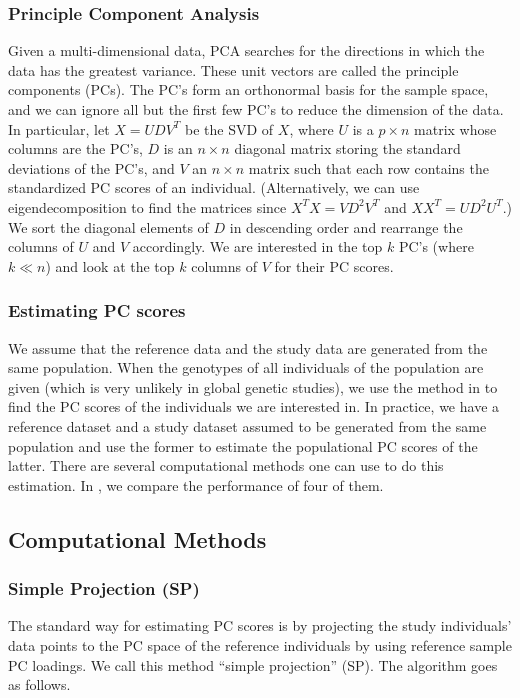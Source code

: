 \documentclass{article}
\begin{document}
\subsubsection{Principle Component Analysis}\label{pca-intro}
Given a multi-dimensional data, PCA searches for the directions in which the data has the greatest variance.
These unit vectors are called the principle components (PCs).
The PC's form an orthonormal basis for the sample space,
and we can ignore all but the first few PC's to reduce the dimension of the data.
In particular, let $X=UDV^T$ be the SVD of $X$,
where $U$ is a $p \times n$ matrix whose columns are the PC's,
$D$ is an $n \times n$ diagonal matrix storing the standard deviations of the PC's,
and $V$ an $n \times n$ matrix such that each row contains the standardized PC scores of an individual.
(Alternatively, we can use eigendecomposition to find the matrices since $X^T X = VD^2V^T$ and $X X^T = UD^2U^T$.)
We sort the diagonal elements of $D$ in descending order and rearrange the
columns of $U$ and $V$ accordingly.
We are interested in the top $k$ PC's (where $k \ll n$) and look at the top $k$
columns of $V$ for their PC scores.

\subsubsection{Estimating PC scores}

We assume that the reference data and the study data are generated from the same
population.
When the genotypes of all individuals of the population are given (which is very
unlikely in global genetic studies),
we use the method in  to find the PC scores of the individuals
we are interested in.
In practice, we have a reference dataset and a study dataset assumed to be generated from the
same population and use the former to estimate the populational PC scores of the latter.
There are several computational methods one can use to do this estimation.
In , we compare the performance of four of them.

\subsection{Computational Methods}\label{sec:compu}



\subsubsection{Simple Projection (SP)}
The standard way for estimating PC scores is by projecting the study
individuals' data points to the PC space of the reference individuals by using reference sample PC loadings.
We call this method ``simple projection'' (SP).
The algorithm goes as follows.
\end{document}
